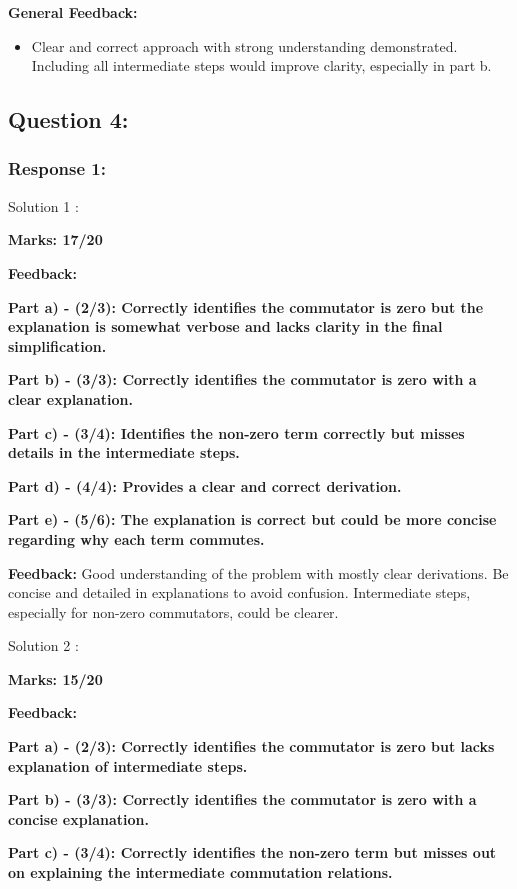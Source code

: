 \documentclass[a4paper,11pt]{article}
\begin{document}
\textbf{General Feedback:}

\begin{itemize}
    \item Clear and correct approach with strong understanding demonstrated. Including all intermediate steps would improve clarity, especially in part b.
\end{itemize}


\subsection*{Question 4:}

\subsubsection*{Response 1:}

Solution 1 :

\textbf{Marks: 17/20}

\textbf{Feedback:}

\textbf{Part a) - (2/3): Correctly identifies the commutator is zero but the explanation is somewhat verbose and lacks clarity in the final simplification.}

\textbf{Part b) - (3/3): Correctly identifies the commutator is zero with a clear explanation.}

\textbf{Part c) - (3/4): Identifies the non-zero term correctly but misses details in the intermediate steps.}

\textbf{Part d) - (4/4): Provides a clear and correct derivation.}

\textbf{Part e) - (5/6): The explanation is correct but could be more concise regarding why each term commutes.}


\textbf{Feedback:}
Good understanding of the problem with mostly clear derivations. Be concise and detailed in explanations to avoid confusion. Intermediate steps, especially for non-zero commutators, could be clearer.


Solution 2 :

\textbf{Marks: 15/20}

\textbf{Feedback:}

\textbf{Part a) - (2/3): Correctly identifies the commutator is zero but lacks explanation of intermediate steps.}

\textbf{Part b) -  (3/3): Correctly identifies the commutator is zero with a concise explanation.}

\textbf{Part c) - (3/4): Correctly identifies the non-zero term but misses out on explaining the intermediate commutation relations.}
\end{document}
